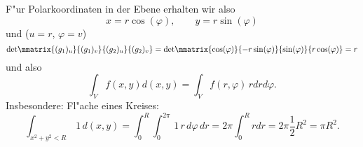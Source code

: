 \begin{bspX}
F"ur Polarkoordinaten in der Ebene erhalten wir also
$$ x= r\cos(\varphi),\qquad y = r\sin(\varphi)$$
und ($u = r$, $\varphi = v$)
$$ 
\mbox{det}\mmatrix{(g_1)_u}{(g_1)_v}{(g_2)_u}{(g_2)_v}
=
\mbox{det}\mmatrix{\cos(\varphi)}{-r\sin(\varphi)}{\sin(\varphi)}{r\cos(\varphi)}
= r
$$
und also
$$ \int_V f(x,y) d(x,y)  = \int_V f(r,\varphi) \, r dr d\varphi.$$
\medskip
Insbesondere: Fl"ache eines Kreises:
$$\int_{x^2+y^2 < R} \, 1 \, d(x,y) = \int_0^R \int_0^{2\pi}\, 1 \, r \,d\varphi \,dr = 2\pi \int_0^R r dr = 2\pi \frac 1 2 R^2 = \pi R^2.$$
\end{bspX}
